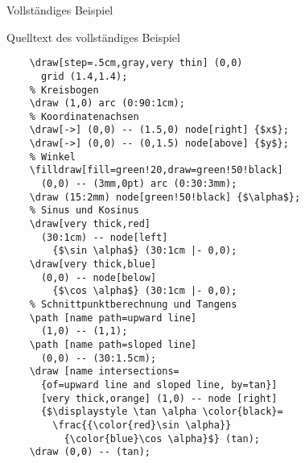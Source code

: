 \begin{Frame}[fragile]{Vollständiges Beispiel}
\end{Frame}

\begin{Frame}{Quelltext des vollständiges Beispiel}
  \begin{lstlisting}[gobble=4]
    % Gitter im Hintergrund
    \draw[step=.5cm,gray,very thin] (0,0)
      grid (1.4,1.4);
    % Kreisbogen
    \draw (1,0) arc (0:90:1cm);
    % Koordinatenachsen
    \draw[->] (0,0) -- (1.5,0) node[right] {$x$};
    \draw[->] (0,0) -- (0,1.5) node[above] {$y$};
    % Winkel
    \filldraw[fill=green!20,draw=green!50!black]
      (0,0) -- (3mm,0pt) arc (0:30:3mm);
    \draw (15:2mm) node[green!50!black] {$\alpha$};
    % Sinus und Kosinus
    \draw[very thick,red]
      (30:1cm) -- node[left]
        {$\sin \alpha$} (30:1cm |- 0,0);
    \draw[very thick,blue]
      (0,0) -- node[below]
        {$\cos \alpha$} (30:1cm |- 0,0);
    % Schnittpunktberechnung und Tangens
    \path [name path=upward line]
      (1,0) -- (1,1);
    \path [name path=sloped line]
      (0,0) -- (30:1.5cm);
    \draw [name intersections=
      {of=upward line and sloped line, by=tan}]
      [very thick,orange] (1,0) -- node [right]
      {$\displaystyle \tan \alpha \color{black}=
        \frac{{\color{red}\sin \alpha}}
          {\color{blue}\cos \alpha}$} (tan);
    \draw (0,0) -- (tan);
  \end{lstlisting}
\end{Frame}


